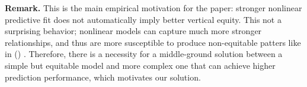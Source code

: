 \documentclass[12pt, draft]{article}
\theoremstyle{plain}
\theoremstyle{definition}
\newcommand{\1}{\mathbf{1}}
\begin{document}
\medskip

\noindent \textbf{Remark.} This is the main empirical motivation for the paper: stronger nonlinear predictive fit does not automatically imply better vertical equity. This not a surprising behavior; nonlinear models can capture much more stronger relationships, and thus are more susceptible to produce non-equitable patters like in (\label{eq:covariance_population_identity}) . Therefore, there is a necessity for a middle-ground solution between a simple but equitable model and more complex one that can achieve higher prediction performance, which motivates our solution.


\begin{table}[!ht]
\centering
\caption{Baseline comparison on the \textit{test} set ($\sim$2023). Lower is better for MAE, COD, and COV. For PRD, values closer to one are preferred; for VEI and PRB, values closer to zero are preferred.}
\label{tab:baseline_models}
\end{table}
\end{document}
